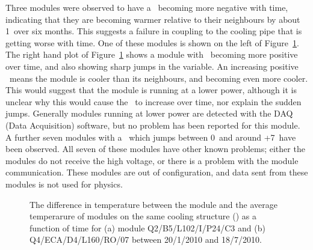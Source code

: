 Three modules were observed to have a \tdiff\ becoming more negative with time,
indicating that they are becoming warmer relative to their neighbours by about
1\dc\ over six months. This suggests a failure in coupling to the cooling pipe
that is getting worse with time. One of these modules is shown on the left of
Figure~\ref{fig:pm_ev_tdiff}.  The right hand plot of
Figure~\ref{fig:pm_ev_tdiff} shows a module with \tdiff\ becoming more positive
over time, and also showing sharp jumps in the variable. An increasing positive
\tdiff\ means the module is cooler than its neighbours, and becoming even more
cooler. This would suggest that the module is running at a lower power, although
it is unclear why this would cause the \tdiff\ to increase over time, nor explain
the sudden jumps. Generally modules running at lower power are detected with the
DAQ (Data Acquisition) software, but no problem has been reported for this
module. A further seven modules with a \tdiff\ which jumps between 0\dc\ and
around +7\dc\ have been observed.  All seven of these modules have other known
problems; either the modules do not receive the high voltage, or there is a
problem with the module communication. These modules are out of configuration,
and data sent from these modules is not used for physics.

\begin{figure}[h]
 	\centering
	\caption{The difference in temperature between the module and the average
  temperarure of modules on the same cooling structure (\tdiff) as a function of
  time for (a) module Q2/B5/L102/I/P24/C3 and (b) Q4/ECA/D4/L160/RO/07 between
  20/1/2010 and 18/7/2010. }
	\label{fig:pm_ev_tdiff}
\end{figure}

